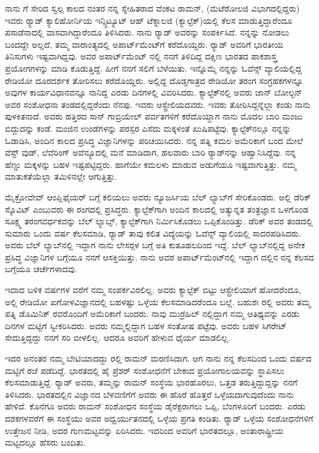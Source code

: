 ನಾನು  ಗೆ ಸೇರಿದ ಸ್ವಲ್ಪ ಕಾಲದ ನಂತರ ನನ್ನ ಸ್ನೇಹಿತರಾದ ವೆಂಕಟ ರಾಮನ್, (ಮೆಟೆರೋಲಜಿ ವಿಭಾಗದಲ್ಲಿದ್ದರು) ಇವರು ರ‍್ಯಾಡ್ ಕ್ಯಾಲಿಹೋರ್ನಿಯ ಇನ್ಸ್ಟಿಟ್ಯೂಟ್ ಆಹ್ ಟೆಕ್ನಾಲಜಿ (ಕ್ಯಾಲ್ಟೆಕ್)ಯಲ್ಲಿ ಕೆಲಸ ಮಾಡುತ್ತಿದ್ದಾರೆಂದೂ ಪಸಾಡೆನಾದಲ್ಲಿ ವಾಸವಾಗಿದ್ದಾರೆಂದೂ ತಿಳಿಸಿದರು. ನಾನು ರ‍್ಯಾಡ್ ಅವರನ್ನು ಸಂಪರ್ಕಿಸಿದೆ. ನನ್ನನ್ನು ನೋಡಲು ಬಂದದ್ದೇ ಅಲ್ಲದೆ, ತಮ್ಮ ವಾರಾಂತ್ಯದಲ್ಲಿ ಅಪಾರ್ಟ್‌ಮೆಂಟ್‍ಗೆ ಕರೆದೊಯ್ದರು. ರ‍್ಯಾಡ್ ಅವರಿಗೆ ಭಾರತೀಯ ತಿನಿಸುಗಳು ಇಷ್ಟವಾಗಿದ್ದವು. ಅವರ ಅಪಾರ್ಟ್‌ಮೆಂಟ್ ನಲ್ಲಿ ನನಗೆ ತಿಳಿದಿದ್ದ ದಕ್ಷಿಣ ಭಾರತದ ಪಾಕಶಾಸ್ತ್ರ ಪ್ರಯೋಗಗಳನ್ನು ಮಾಡಿ ಕೊಡುತ್ತಿದ್ದೆ. ಹೀಗೆ ನನಗೆ ಸಲಿಗೆ ಬೆಳೆಯಿತು. ಇನ್ನೊಮ್ಮೆ ನನ್ನನ್ನು ಓವೆನ್ಸ್ ವ್ಯಾಲಿಯಲ್ಲಿದ್ದ ರೇಡಿಯೋ ದೂರದರ್ಶಕ ತೋರಿಸಲು ಕರೆದೊಯ್ದರು. ಅಲ್ಲಿದ್ದ ದೊಡ್ಡಗಾತ್ರದ ರೇಡಿಯೋ ತರಂಗ ಸಂಗ್ರಹಕಗಳನ್ನೂ ಅವುಗಳ ಕಾರ್ಯವಿಧಾನವನ್ನೂ ನಾನಿದ್ದ ಎರಡು ದಿನಗಳಲ್ಲಿ ವಿವರಿಸಿದರು. ಕ್ಯಾಲ್ಟೆಕ್‍ನಲ್ಲಿ ಅವರು ಜಾನ್ ಬೋಲ್ಟನ್ ಅವರ ಸಂಶೋಧನಾ ತಂಡದಲ್ಲಿದ್ದರೆಂದು ನೆನಪು. ಇವರು ಆಸ್ಟ್ರೇಲಿಯದವರು. ಇವರು ತೋರಿಸಿದ್ದನ್ನೆಲ್ಲಾ ಕಂಡು ನಾನು ಪುಳಕಿತನಾದೆ. ಅವರು ಹತ್ತಿರದ ಸಾನ್ ಗಾಬ್ರಿಯೇಲ್ ಪರ್ವತಗಳಿಗೆ ಕರೆದೊಯ್ದಾಗ ನಾನು ಮೊದಲ ಬಾರಿ ಮಂಜು ಬಿದ್ದುದನ್ನು ಕಂಡೆ. ಮಂಜಿನ ಉಂಡೆಗಳನ್ನು ಪರಸ್ಪರ ಎಸೆದು ಮಕ್ಕಳಂತೆ ಖುಷಿಪಟ್ಟೆವು. ಕ್ಯಾಲ್ಟೆಕ್‍ನಲ್ಲೂ ನನ್ನನ್ನು ಓಡಾಡಿಸಿ, ಅಂದಿನ ಕಾಲದ ಪ್ರಸಿದ್ಧ ವಿಜ್ಞಾನಿಗಳನ್ನು ಪರಿಚಯಿಸಿದರು. ನನ್ನ ಪತ್ನಿ ಕಮಲ ಅಮೆರಿಕಾಗೆ ಬಂದ ಮೇಲೆ ವೆಸ್ಟ್ ವುಡ್, ಲೆವೆರಿಂಗ್ ಅವೆನ್ಯೂದಲ್ಲಿ ಮನೆ ಮಾಡಿದಾಗ, ಹಲವಾರು ಬಾರಿ ರ‍್ಯಾಡ್‍ನನ್ನು ಆಹ್ವಾನಿಸಿದ್ದೆವು. ನನ್ನ ಹೆಣ್ಣು ಮಕ್ಕಳನ್ನು ಬಹಳ ಇಷ್ಟಪಟ್ಟಿದ್ದರು. ಹಾಗೆಯೇ ಕಮಲಳು ಮಾಡುವ ಅಡುಗೆಯೂ ಇಷ್ಟವಾಗುತ್ತಿತ್ತು. ನಮ್ಮ ಮಾತುಕತೆಯೆಲ್ಲಾ ತಮಿಳಿನಲ್ಲೇ ಆಗುತ್ತಿತ್ತು.

ಮೈಕ್ರೋವೇವ್ ಆಂಪ್ಲಿಫೈಯರ್ ಬಗ್ಗೆ ಕಲಿಯಲು ಅವರು ನ್ಯೂಜರ್ಸಿಯ ಬೆಲ್ ಲ್ಯಾಬ್‍ಗೆ ಸೇರಿಕೊಂಡರು. ಅಲ್ಲಿ ಡೆರಿಕ್ ಸ್ಕೊವಿಟ್ ಎಂಬುವರು ಈ ರಂಗದಲ್ಲಿ ಪ್ರಸಿದ್ಧರು. ಕ್ಯಾಲ್ಟೆಕ್‍ಗಾಗಿ ಅಂದಿನ ಕಾಲದಲ್ಲಿ ಅತ್ಯುನ್ನತ ತಂತ್ರಜ್ಞಾನ ಒಳಗೊಂಡ ಸೂಕ್ಷ್ಮ ತರಂಗವರ್ಧಕವನ್ನು ಬೆಲ್ ಲ್ಯಾಬ್ಸ್, ಕ್ಯಾಲ್ಟೆಕ್‍ಗಾಗಿ ನಿರ್ಮಿಸಿಕೊಡಲು ಒಪ್ಪಿಕೊಂಡಿತ್ತು. ಡೆರಿಕ್ ಅವರ ತಂಡದಲ್ಲಿ ಸುಮಾರು ಒಂದು ವರ್ಷ ಕೆಲಸಮಾಡಿ, ರ‍್ಯಾಡ್ ತಾವು ಕಲಿತ ವಿದ್ಯೆಯನ್ನು ಓವೆನ್ಸ್ ವ್ಯಾಲಿಯಲ್ಲಿ ಸಾದರಪಡಿಸಿದರು. ಅವರು ಬೆಲ್ ಲ್ಯಾಬ್‍ನಲ್ಲಿ ಇದ್ದಾಗ ನಾನು ಲೇಸರ್‍ಗಳ ಬಗ್ಗೆ ಅತಿ ಕುತೂಹಲದಿಂದ ಇದ್ದೆ. ಬೆಲ್ ಲ್ಯಾಬ್‍ನಲ್ಲಿದ್ದ ಅನೇಕ ಪ್ರಸಿದ್ಧ ವಿಜ್ಞಾನಿಗಳ ಬಗ್ಗೆಯೂ ನನಗೆ ಆಸಕ್ತಿಯಿತ್ತು. ನಾನು ಅವರ ಅಪಾರ್ಟ್‌ಮೆಂಟ್‍ನಲ್ಲಿ ಇದ್ದಾಗ  ದಲ್ಲಿನ ನನ್ನ ಕೆಲಸದ ಬಗ್ಗೆಯೂ ಚರ್ಚೆಗಳಾದವು.

ಇದಾದ ಬಳಿಕ  ವರ್ಷಗಳ ವರೆಗೆ ನಮ್ಮ ಸಂಪರ್ಕವಿರಲಿಲ್ಲ. ಅವರು ಕ್ಯಾಲ್ಟೆಕ್ ಬಿಟ್ಟು ಆಸ್ಟ್ರೇಲಿಯಾಗೆ ಹೋದರೆಂದೂ, ಅಲ್ಲಿ ರೇಡಿಯೋ ಖಗೋಳವಿಜ್ಞಾನದಲ್ಲಿ ಬಹಳಷ್ಟು ಒಳ್ಳೆಯ ಕೆಲಸಮಾಡಿದರೆಂದೂ ಬಲ್ಲೆ. ಬಹುಶಃ ರಲ್ಲಿ ಅವರು ತಮ್ಮ ಪತ್ನಿ ಡೊಮಿನಿಕ್ ರವರೊಂದಿಗೆ ಅಮೆರಿಕಾಗೆ ಬಂದರು. ನಾವು ಮುರ್ರೆಹಿಲ್ ನಲ್ಲಿದ್ದಾಗ ನಮ್ಮ ಆತಿಥ್ಯವನ್ನು ಎರಡು ದಿನಗಳ ಮಟ್ಟಿಗೆ ಸ್ವೀಕರಿಸಿದರು. ಅವರು ನಮ್ಮಲ್ಲಿದ್ದಾಗ ಬಹಳ ಸಂತೋಷ ಪಟ್ಟೆವು. ಅವರು ಬಹಳ ಸಿಗರೇಟ್ ಸೇದುತ್ತಿದ್ದದ್ದು ನನಗೆ ಸರಿ ಬೀಳಲಿಲ್ಲ. ಆದರೂ ಅವರಿಗೆ ಹೇಳುವ ಧೈರ್ಯ ಮಾಡಲಿಲ್ಲ.

ಇದರ ಅನಂತರ ನಮ್ಮ ಬೇಟಿಯಾದದ್ದು ರಲ್ಲಿ ರಾಮನ್ ಮರಣಿಸಿದಾಗ. ಆಗ ನಾನು ನನ್ನ ಕೆಲಸದಿಂದ ಒಂದು ವರ್ಷದ ಮಟ್ಟಿಗೆ ರಜೆ ಪಡೆದಿದ್ದೆ. ಭಾರತದಲ್ಲಿ ಹೈ ಪ್ರೆಶರ್ ಸಂಶೋಧನೆಗೆ ಬೇಕಾದ ಪ್ರಯೋಗಾಲಯವನ್ನು ಸ್ಥಾಪಿಸಲು ಕೆಲಸಮಾಡುತ್ತಿದ್ದೆ. ರ‍್ಯಾಡ್ ಅವರು, ತಮ್ಮನ್ನು ರಾಮನ್ ಸಂಸ್ಥೆಯ ಭಾರಹೊರಲು, ಒತ್ತಡ ತರುತ್ತಿದ್ದುದ್ದನ್ನು ನನಗೆ ತಿಳಿಸಿದರು. ಭಾರತದಲ್ಲಿನ ವಿಜ್ಞಾನದ ಬೆಳವಣಿಗೆಗೆ ಅವರು ಈ ಹೊರೆ ಹೊತ್ತರೆ ಒಳ್ಳೆಯದಾಗುವುದೆಂದು ನಾನು ಹೇಳಿದೆ. ಕೊನೆಗೂ ಅವರು ರಾಮನ್ ಸಂಶೋಧನ ಸಂಸ್ಥೆಯ ಡೈರೆಕ್ಟರಾಗಲು ಒಪ್ಪಿ, ಬೆಂಗಳೂರಿಗೆ ಬಂದರು. ಎರಡು ದಶಕಗಳವರೆಗೆ ಈ ಸಂಸ್ಥೆಯು ಅವರ ಅಧ್ವರ್ಯುತನದಲ್ಲಿ ಒಳ್ಳೆಯ ಪ್ರಗತಿ ಕಂಡಿತು. ರ‍್ಯಾಡ್ ಒಳ್ಳೆಯ ಸಂಶೋಧನೆಗಳಿಗೆ ಉತ್ತೇಜನ ನೀಡಿ, ಅದರ ಗುಣಮಟ್ಟವನ್ನು ಏರಿಸಿದರು. ಇದರಿಂದ ಅವರಿಗೆ ಭಾರತದಲ್ಲೂ, ಅಂತಾರಾಷ್ಟ್ರೀಯ ಮಟ್ಟದಲ್ಲೂ ಹೆಸರು ಬಂದಿತು.

